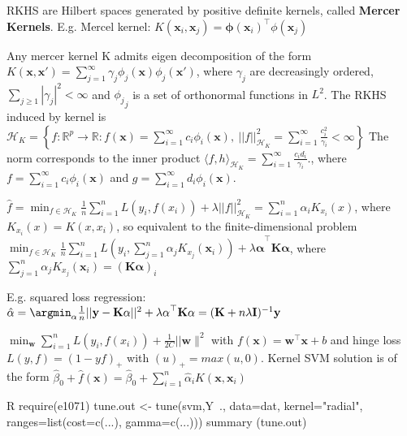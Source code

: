 \begin{sectionbox}[RKHS]\nospacing{}
RKHS are Hilbert spaces generated by positive definite kernels, called \textbf{Mercer Kernels}. E.g. Mercel kernel: $K(\mathbf{x}_i,\mathbf{x}_j) = \mathbf\phi(\mathbf{x}_i)^\top\phi(\mathbf{x}_j)$



\end{sectionbox}
\begin{sectionbox}
Any mercer kernel K admits eigen decomposition of the form
$K(\mathbf{x}, \mathbf{x}') = \sum_{j=1}^{\infty} \gamma_j \phi_j(\mathbf{x}) \phi_j(\mathbf{x}')$, where $\gamma_j$ are decreasingly ordered, $\sum_{j\geq 1}|\gamma_j|^2<\infty$ and ${\phi_j}_j$ is a set of orthonormal functions in $L^2$. The RKHS induced by kernel is $\mathcal{H}_K = \left\{ f : \mathbb{R}^p \to \mathbb{R} : f(\mathbf{x}) = \sum_{i=1}^{\infty} c_i \phi_i(\mathbf{x}), \ ||f||_{\mathcal{H}_K}^2=\sum_{i=1}^{\infty} \frac{c_i^2}{\gamma_i} < \infty \right\}$ The norm corresponds to the inner product $\langle f, h \rangle_{\mathcal{H}_K} = \sum_{i=1}^{\infty} \frac{c_i d_i}{\gamma_i}.
$, where $f =  \sum_{i=1}^{\infty} c_i\phi_i(\mathbf{x})$ and $g =  \sum_{i=1}^{\infty} d_i\phi_i(\mathbf{x})$.

\end{sectionbox}
\begin{sectionbox}\nospacing{}
$\hat{f} = \min_{f\in \mathcal{H}_K}\frac1n\sum^n_{i=1}{L(y_i,f(x_i)) + \lambda ||{f}||_{\mathcal{H}_K}^2} = \sum_{i=1}^n\hat{\alpha_i}K_{x_i}(x)$, where $K_{x_i}(x)=K(x,x_i)$, so equivalent to the finite-dimensional problem $\min_{f\in \mathcal{H}_K}\frac1n\sum^n_{i=1}{L(y_i,\sum_{j=1}^n\alpha_jK_{x_j}(\mathbf{x}_i)) + \lambda \mathbf{\alpha}}^\top\mathbf{K}\mathbf{\alpha}$, where $\sum_{j=1}^n\alpha_jK_{x_j}(\mathbf{x}_i) = (\mathbf{K\alpha})_i$

E.g. squared loss regression: $\hat{\alpha} = \argmin_{\alpha}{\frac1n ||\mathbf{y} - \mathbf{K\alpha}||^2 + \mathbf{\lambda\alpha}^\top \mathbf{K\alpha}} = (\mathbf{K} + n\mathbf{\lambda I})^{-1}\mathbf{y}$

\end{sectionbox}
\begin{sectionbox}[SVM]\nospacing{}
$\min_{\mathbf{w}} \sum_{i=1}^{n} L(y_i, f(x_i)) + \frac{1}{2C}||\mathbf{w}\|^2$ with $f(\mathbf{x}) = \mathbf{w}^\top\mathbf{x} + b$ and hinge loss $L(y,f) = (1-yf)_+$ with $(u)_+ = max(u,0)$. Kernel SVM solution is of the form $\hat{\beta}_0 + \hat{f}(\mathbf{x}) = \hat{\beta}_0 + \sum_{i=1}^n{\hat\alpha_i}K(\mathbf{x},\mathbf{x}_i)$
\begin{mintlinebox}{R}
    require(e1071)
    tune.out <- tune(svm,Y~., data=dat, kernel="radial", ranges=list(cost=c(...), gamma=c(...)))
    summary (tune.out)
  \end{mintlinebox}
\end{sectionbox}